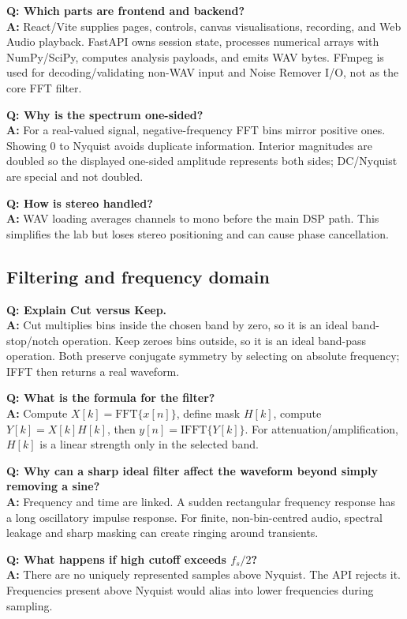 \documentclass[11pt,a4paper]{article}
\begin{document}
\textbf{Q: Which parts are frontend and backend?}\\
\textbf{A:} React/Vite supplies pages, controls, canvas visualisations, recording, and Web Audio playback. FastAPI owns session state, processes numerical arrays with NumPy/SciPy, computes analysis payloads, and emits WAV bytes. FFmpeg is used for decoding/validating non-WAV input and Noise Remover I/O, not as the core FFT filter.

\textbf{Q: Why is the spectrum one-sided?}\\
\textbf{A:} For a real-valued signal, negative-frequency FFT bins mirror positive ones. Showing 0 to Nyquist avoids duplicate information. Interior magnitudes are doubled so the displayed one-sided amplitude represents both sides; DC/Nyquist are special and not doubled.

\textbf{Q: How is stereo handled?}\\
\textbf{A:} WAV loading averages channels to mono before the main DSP path. This simplifies the lab but loses stereo positioning and can cause phase cancellation.

\subsection*{Filtering and frequency domain}
\textbf{Q: Explain Cut versus Keep.}\\
\textbf{A:} Cut multiplies bins inside the chosen band by zero, so it is an ideal band-stop/notch operation. Keep zeroes bins outside, so it is an ideal band-pass operation. Both preserve conjugate symmetry by selecting on absolute frequency; IFFT then returns a real waveform.

\textbf{Q: What is the formula for the filter?}\\
\textbf{A:} Compute \(X[k]=\mathrm{FFT}\{x[n]\}\), define mask \(H[k]\), compute \(Y[k]=X[k]H[k]\), then \(y[n]=\mathrm{IFFT}\{Y[k]\}\). For attenuation/amplification, \(H[k]\) is a linear strength only in the selected band.

\textbf{Q: Why can a sharp ideal filter affect the waveform beyond simply removing a sine?}\\
\textbf{A:} Frequency and time are linked. A sudden rectangular frequency response has a long oscillatory impulse response. For finite, non-bin-centred audio, spectral leakage and sharp masking can create ringing around transients.

\textbf{Q: What happens if high cutoff exceeds \(f_s/2\)?}\\
\textbf{A:} There are no uniquely represented samples above Nyquist. The API rejects it. Frequencies present above Nyquist would alias into lower frequencies during sampling.
\end{document}
